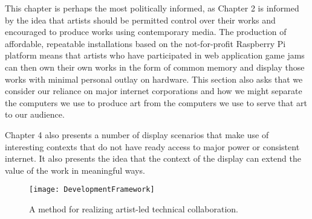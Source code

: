 This chapter is perhaps the most politically informed, as Chapter 2 is informed by the idea that artists should be permitted control over their works and encouraged to produce works using contemporary media. The production of affordable, repeatable installations based on the not-for-profit Raspberry Pi platform means that artists who have participated in web application game jams can then own their own works in the form of common memory and display those works with minimal personal outlay on hardware. This section also asks that we consider our reliance on major internet corporations and how we might separate the computers we use to produce art from the computers we use to serve that art to our audience.

Chapter 4 also presents a number of display scenarios that make use of interesting contexts that do not have ready access to major power or consistent internet. It also presents the idea that the context of the display can extend the value of the work in meaningful ways.

\clearpage
\thispagestyle{fancy} 
\begin{figure}[!ht]
 \centering
  \texttt{[image: DevelopmentFramework]}
  \caption{A method for realizing artist-led technical collaboration.}
\end{figure}
\newpage

